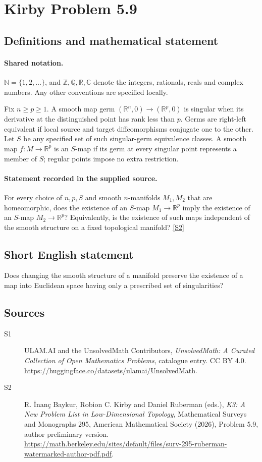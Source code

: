 \documentclass[11pt]{article}
\newcommand{\sref}[2]{\hyperlink{source:#1:#2}{[S#2]}}
\begin{document}
\section{Kirby Problem 5.9}\label{statement}

\subsection{Definitions and mathematical statement}

\paragraph{Shared notation.}$\mathbb N=\{1,2,\ldots\}$, and $\mathbb Z,\mathbb Q,\mathbb R,\mathbb C$ denote the integers, rationals, reals and complex numbers. Any other conventions are specified locally.


Fix $n\geq p\geq1$. A smooth map germ $(\mathbb R^n,0)\to(\mathbb R^p,0)$ is singular when its derivative at the distinguished point has rank less than $p$. Germs are right-left equivalent if local source and target diffeomorphisms conjugate one to the other. Let $S$ be any specified set of such singular-germ equivalence classes. A smooth map $f:M\to\mathbb R^p$ is an $S$-map if its germ at every singular point represents a member of $S$; regular points impose no extra restriction.
\paragraph{Statement recorded in the supplied source.}
For every choice of $n,p,S$ and smooth $n$-manifolds $M_1,M_2$ that are homeomorphic, does the existence of an $S$-map $M_1\to\mathbb R^p$ imply the existence of an $S$-map $M_2\to\mathbb R^p$? Equivalently, is the existence of such maps independent of the smooth structure on a fixed topological manifold? \sref{statement}{2}
\subsection{Short English statement}
Does changing the smooth structure of a manifold preserve the existence of a map into Euclidean space having only a prescribed set of singularities?
\subsection{Sources}
\begin{description}
\item[\hypertarget{source:statement:1}{S1}] ULAM.AI and the UnsolvedMath Contributors, \emph{UnsolvedMath: A Curated Collection of Open Mathematics Problems}, catalogue entry. CC BY 4.0. \url{https://huggingface.co/datasets/ulamai/UnsolvedMath}.
\item[\hypertarget{source:statement:2}{S2}] R. İnanç Baykur, Robion C. Kirby and Daniel Ruberman (eds.), \emph{K3: A New Problem List in Low-Dimensional Topology}, Mathematical Surveys and Monographs 295, American Mathematical Society (2026), Problem 5.9, author preliminary version. \url{https://math.berkeley.edu/sites/default/files/surv-295-ruberman-watermarked-author-pdf.pdf}.
\end{description}
\label{end:statement}
\end{document}
